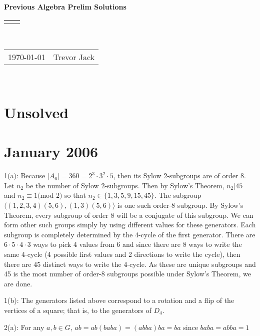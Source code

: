 \documentclass[12pt]{article}
\renewcommand{\title}[1]{\textbf{#1}\\}
\renewcommand{\line}{\begin{tabularx}{\textwidth}{X>{\raggedleft}X}\hline\\\end{tabularx}\\[-0.5cm]}
\newcommand{\leftright}[2]{\begin{tabularx}{\textwidth}{X>{\raggedleft}X}#1%
& #2\\\end{tabularx}\\[-0.5cm]}
\begin{document}
\title{Previous Algebra Prelim Solutions}
\line
\leftright{\today}{Trevor Jack}
\section{Unsolved}

\section{January 2006}
1(a): Because $|A_6|=360=2^3 \cdot 3^2 \cdot 5$, then its Sylow 2-subgroups are of order 8. Let $n_2$ be the number of Sylow 2-subgroups. Then by Sylow's Theorem, $n_2 | 45$ and $n_2 \equiv 1 ($mod $2)$ so that $n_2 \in \{1,3,5,9,15,45 \}$. The subgroup $\langle (1,2,3,4)(5,6),(1,3)(5,6) \rangle$ is one such order-8 subgroup. By Sylow's Theorem, every subgroup of order 8 will be a conjugate of this subgroup. We can form other such groups simply by using different values for these generators. Each subgroup is completely determined by the 4-cycle of the first generator. There are $6 \cdot 5 \cdot 4 \cdot 3$ ways to pick 4 values from 6 and since there are 8 ways to write the same 4-cycle (4 possible first values and 2 directions to write the cycle), then there are 45 distinct ways to write the 4-cycle. As these are unique subgroups and 45 is the most number of order-8 subgroups possible under Sylow's Theorem, we are done. \newline

1(b): The generators listed above correspond to a rotation and a flip of the vertices of a square; that is, to the generators of $D_4$. \newline

2(a): For any $a,b \in G$, $ab = ab (baba)=(abba) ba = ba$ since $baba=abba=1$ \newline
\end{document}
